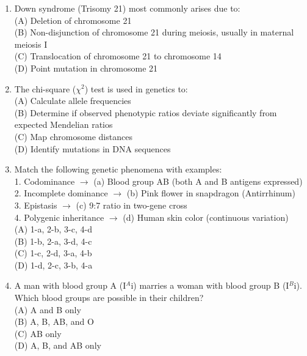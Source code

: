 \documentclass{article}
\begin{document}
\begin{enumerate}[label=Q\arabic*.]
\item Down syndrome (Trisomy 21) most commonly arises due to:
\\(A) Deletion of chromosome 21
\\(B) Non-disjunction of chromosome 21 during meiosis, usually in maternal meiosis I
\\(C) Translocation of chromosome 21 to chromosome 14
\\(D) Point mutation in chromosome 21

\item The chi-square ($\chi^2$) test is used in genetics to:
\\(A) Calculate allele frequencies
\\(B) Determine if observed phenotypic ratios deviate significantly from expected Mendelian ratios
\\(C) Map chromosome distances
\\(D) Identify mutations in DNA sequences

\item Match the following genetic phenomena with examples:\\
1. Codominance $\rightarrow$ (a) Blood group AB (both A and B antigens expressed)\\
2. Incomplete dominance $\rightarrow$ (b) Pink flower in snapdragon (Antirrhinum)\\
3. Epistasis $\rightarrow$ (c) 9:7 ratio in two-gene cross\\
4. Polygenic inheritance $\rightarrow$ (d) Human skin color (continuous variation)
\\(A) 1-a, 2-b, 3-c, 4-d
\\(B) 1-b, 2-a, 3-d, 4-c
\\(C) 1-c, 2-d, 3-a, 4-b
\\(D) 1-d, 2-c, 3-b, 4-a

\item A man with blood group A (I$^A$i) marries a woman with blood group B (I$^B$i). Which blood groups are possible in their children?
\\(A) A and B only
\\(B) A, B, AB, and O
\\(C) AB only
\\(D) A, B, and AB only

\end{enumerate}
\end{document}
